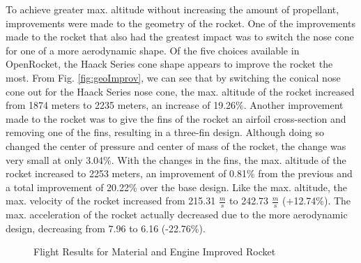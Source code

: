 \documentclass{report}
\begin{document}
\noindent To achieve greater max. altitude without increasing the amount of propellant, improvements were made to the geometry of the rocket.
One of the improvements made to the rocket that also had the greatest impact was to switch the nose cone for one of a more aerodynamic shape.
Of the five choices available in OpenRocket, the Haack Series cone shape appears to improve the rocket the most.
From Fig. \ref{fig:geoImprov}, we can see that by switching the conical nose cone out for the Haack Series nose cone, the max. altitude of the rocket increased from 1874 meters to 2235 meters, an increase of 19.26\%.
Another improvement made to the rocket was to give the fins of the rocket an airfoil cross-section and removing one of the fins, resulting in a three-fin design.
Although doing so changed the center of pressure and center of mass of the rocket, the change was very small at only 3.04\%.
With the changes in the fins, the max. altitude of the rocket increased to 2253 meters, an improvement of 0.81\% from the previous and a total improvement of 20.22\% over the base design.
Like the max. altitude, the max. velocity of the rocket increased from 215.31 $\frac{m}{s}$ to 242.73 $\frac{m}{s}$ (+12.74\%).
The max. acceleration of the rocket actually decreased due to the more aerodynamic design, decreasing from 7.96 to 6.16 (-22.76\%).\\

\begin{figure}[h!]
    \centering
    \caption{Flight Results for Material and Engine Improved Rocket}
    \label{fig:improv2}
\end{figure}
\end{document}
